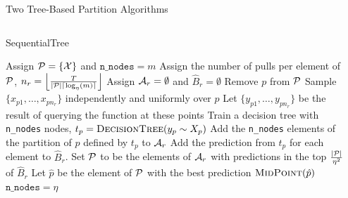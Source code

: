\documentclass[final]{beamer}
\newlength{\sepwid}
\newlength{\onecolwid}
\newlength{\twocolwid}
\begin{document}
\begin{frame}[t]
\begin{columns}[t]
\begin{column}{\sepwid}\end{column} %

\begin{column}{\twocolwid} %

\begin{block}{Two Tree-Based Partition Algorithms}

\begin{columns}[t,totalwidth=\twocolwid] %

\begin{column}{\onecolwid}\vspace{-.6in} %



\begin{algorithm}[H]
\scriptsize
\setlength{\columnwidth}{\onecolwid}
\caption{SequentialTree}
\label{seq_tree}
\begin{algorithmic}[1]
\State Assign $\mathcal{P} = \{\mathcal{X}\}$ and $\texttt{n\_nodes} = m$
\State Assign the number of pulls per element of $\mathcal{P}$, $n_r = \left \lfloor \frac{T}{|\mathcal{P}| \lceil \log_\eta(m) \rceil} \right \rfloor$
\State Assign $\mathcal{A}_r = \emptyset$ and $\hat{B}_r = \emptyset$
\State Remove $p$ from $\mathcal{P}$
\State Sample $\{x_{p1},\ldots, x_{pn_r}\}$ independently and uniformly over $p$
\State Let $\{y_{p1},\ldots, y_{pn_r}\}$ be the result of querying the function at these points
\State Train a decision tree with \texttt{n\_nodes} nodes, $t_p = \textproc{DecisionTree}(y_p \sim X_p)$
\State Add the \texttt{n\_nodes} elements of the partition of $p$ defined by $t_p$ to $\mathcal{A}_r$
\State Add the prediction from $t_p$ for each element to $\hat{B}_r$.
\EndFor
{}
\State Set $\mathcal{P}$ to be the elements of $\mathcal{A}_r$ with predictions in the top $\frac{|\mathcal{P}|}{\eta^2}$ of $\hat{B}_r$
\Else 
\State Let $\hat{p}$ be the element of $\mathcal{P}$ with the best prediction
\State \Return $\textproc{MidPoint}(\hat{p})$
\EndIf
\State $\texttt{n\_nodes} = \eta$
\EndFor

\EndProcedure
\end{algorithmic}


\end{algorithm}
\end{column}
\end{columns}
\end{block}
\end{column}
\end{columns}
\end{frame}
\end{document}
